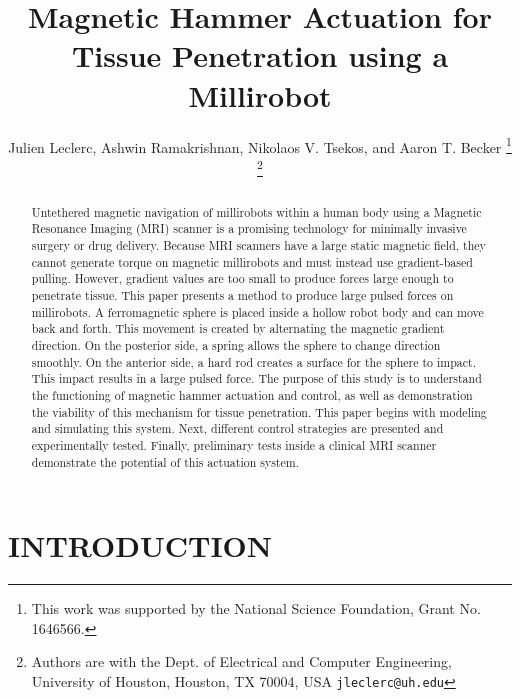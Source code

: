 \documentclass[letterpaper, 10 pt, conference]{ieeeconf}  %
\title{\LARGE \bf
Magnetic Hammer Actuation for Tissue Penetration using a Millirobot}
\author{Julien Leclerc, Ashwin Ramakrishnan, Nikolaos V. Tsekos, and Aaron T. Becker %
\thanks{This work was supported by the National Science Foundation, Grant No. 1646566. }%
\thanks{Authors are with the Dept. of Electrical and Computer
Engineering, University of Houston, Houston, TX 70004, USA
        {\tt\small jleclerc@uh.edu}}%
}
\begin{document}
\maketitle
\thispagestyle{empty}
\pagestyle{empty}


\begin{abstract}

Untethered magnetic navigation of millirobots within a human body using a Magnetic Resonance Imaging (MRI) scanner is a promising technology for minimally invasive surgery or drug delivery.
Because MRI scanners have a large static magnetic field, they cannot generate torque on magnetic millirobots and must instead use gradient-based pulling.
 However, gradient values are too small to produce forces large enough to penetrate tissue. 
 This paper presents a method to produce large pulsed forces on millirobots. 
 A ferromagnetic sphere is placed inside a hollow robot body and can move back and forth. 
 This movement is created by alternating the magnetic gradient direction. 
 On the posterior side, a spring allows the sphere to change direction smoothly. 
 On the anterior side, a hard rod creates a surface for the sphere to impact. 
 This impact results in a large pulsed force. 
 The purpose of this study is to understand the functioning of magnetic hammer actuation and control, as well as demonstration the viability of this mechanism for tissue penetration.
 This paper begins with modeling and simulating this system. 
 Next, different control strategies are presented and experimentally tested.
  Finally, preliminary tests inside a clinical MRI scanner demonstrate the potential of this actuation system. 

\end{abstract}


\section{INTRODUCTION}
\end{document}
